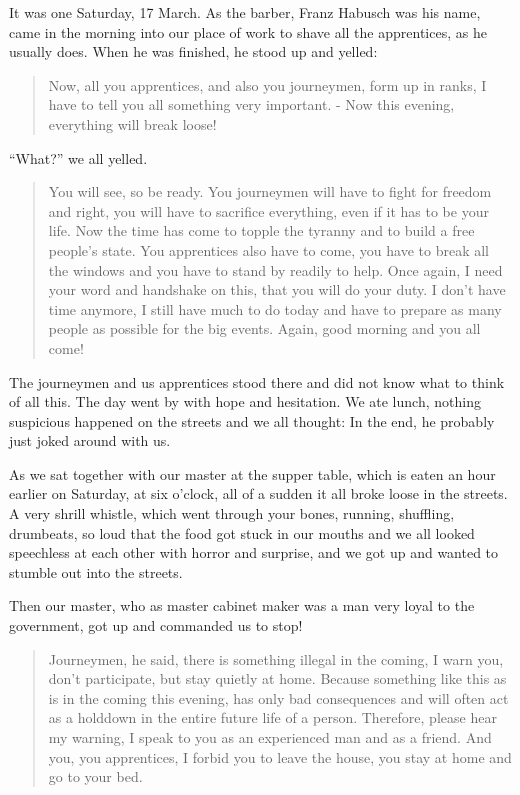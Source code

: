 \documentclass{article}
\begin{document}
It was one Saturday, 17 March. As the barber, Franz Habusch was his name, came in the morning into our place of work to shave all the apprentices, as he usually does. When he was finished, he stood up and yelled:

\begin{quote}
Now, all you apprentices, and also you journeymen, form up in ranks, I have to tell you all something very important. - Now this evening, everything will break loose!
\end{quote}

``What?'' we all yelled.

\begin{quote}
You will see, so be ready. You journeymen will have to fight for freedom and right, you will have to sacrifice everything, even if it has to be your life. Now the time has come to topple the tyranny and to build a free people's state. You apprentices also have to come, you have to break all the windows and you have to stand by readily to help. Once again, I need your word and handshake on this, that you will do your duty. I don't have time anymore, I still have much to do today and have to prepare as many people as possible for the big events. Again, good morning and you all come!
\end{quote}

The journeymen and us apprentices stood there and did not know what to think of all this. The day went by with hope and hesitation. We ate lunch, nothing suspicious happened on the streets and we all thought: In the end, he probably just joked around with us.

As we sat together with our master at the supper table, which is eaten an hour earlier on Saturday, at six o'clock, all of a sudden it all broke loose in the streets. A very shrill whistle, which went through your bones, running, shuffling, drumbeats, so loud that the food got stuck in our mouths and we all looked speechless at each other with horror and surprise, and we got up and wanted to stumble out into the streets.

Then our master, who as master cabinet maker was a man very loyal to the government, got up and commanded us to stop!

\begin{quote}
Journeymen, he said, there is something illegal in the coming, I warn you, don't participate, but stay quietly at home. Because something like this as is in the coming this evening, has only bad consequences and will often act as a holddown in the entire future life of a person. Therefore, please hear my warning, I speak to you as an experienced man and as a friend. And you, you apprentices, I forbid you to leave the house, you stay at home and go to your bed.
\end{quote}
\end{document}

